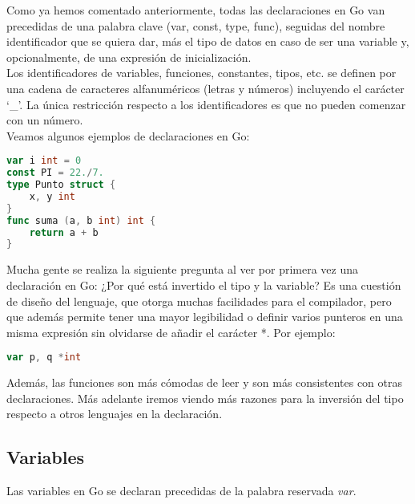 Como ya hemos comentado anteriormente, todas las declaraciones en Go van
precedidas de una palabra clave (var, const, type, func), seguidas del nombre
identificador que se quiera dar, más el tipo de datos en caso de ser una
variable y, opcionalmente, de una expresión de inicialización.\\

Los identificadores de variables, funciones, constantes, tipos, etc. se definen
por una cadena de caracteres alfanuméricos (letras y números) incluyendo el
carácter `\_'. La única restricción respecto a los identificadores es que no
pueden comenzar con un número.\\

Veamos algunos ejemplos de declaraciones en Go:

\begin{minipage}{17.1cm}
\begin{lstlisting}[language=go,numbers=none, caption=Declaraciones, label=declaraciones]
var i int = 0
const PI = 22./7.
type Punto struct {
	x, y int
}
func suma (a, b int) int {
	return a + b
}
\end{lstlisting}
\end{minipage}

Mucha gente se realiza la siguiente pregunta al ver por primera vez una
declaración en Go: ¿Por qué está invertido el tipo y la variable? Es
una cuestión de diseño del lenguaje, que otorga muchas facilidades para el
compilador, pero que además permite tener una mayor legibilidad o definir varios
punteros en una misma expresión sin olvidarse de añadir el carácter *. Por ejemplo:

\begin{minipage}{17.1cm}
\begin{lstlisting}[language=go,numbers=none]
var p, q *int
\end{lstlisting}
\end{minipage}

Además, las funciones son más cómodas de leer y son más consistentes con otras
declaraciones. Más adelante iremos viendo más razones para la inversión del tipo
respecto a otros lenguajes en la declaración.

	\subsection{Variables}

	Las variables en Go se declaran precedidas de la palabra reservada
	\emph{var}.\\


